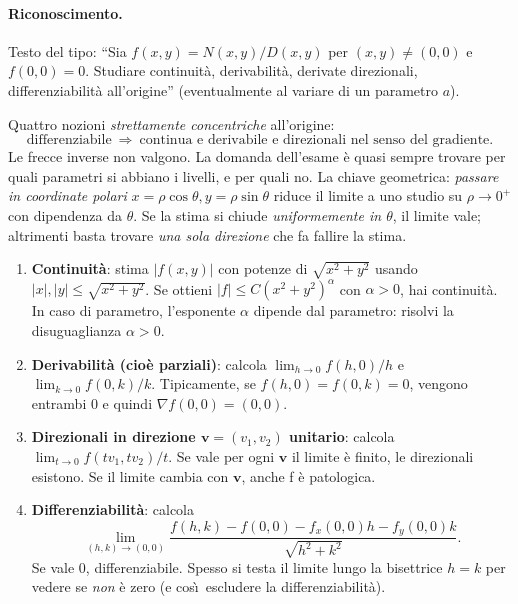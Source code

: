 \documentclass[11pt,a4paper,openany]{book}
\theoremstyle{plain}
\theoremstyle{definition}
\theoremstyle{remark}
\renewcommand{\vec}[1]{\mathbf{#1}}
\begin{document}
\paragraph{Riconoscimento.} Testo del tipo:
``Sia $f(x,y)=N(x,y)/D(x,y)$ per $(x,y)\ne(0,0)$ e $f(0,0)=0$. Studiare
continuit\`a, derivabilit\`a, derivate direzionali, differenziabilit\`a
all'origine'' (eventualmente al variare di un parametro $a$).

\begin{nota}[title={Intuizione}]
Quattro nozioni \emph{strettamente concentriche} all'origine:
\[
\text{differenziabile}\ \Rightarrow\ \text{continua e derivabile e
direzionali nel senso del gradiente}.
\]
Le frecce inverse non valgono. La domanda dell'esame \`e quasi sempre
trovare per quali parametri si abbiano i livelli, e per quali no.
La chiave geometrica: \emph{passare in coordinate polari}
$x=\rho\cos\theta,y=\rho\sin\theta$ riduce il limite a uno studio
su $\rho\to 0^+$ con dipendenza da $\theta$. Se la stima si chiude
\emph{uniformemente in $\theta$}, il limite vale; altrimenti basta
trovare \emph{una sola direzione} che fa fallire la stima.
\end{nota}

\begin{ricetta}[title={Studio in $(0,0)$}]
\begin{enumerate}
\item \textbf{Continuit\`a}: stima $|f(x,y)|$ con potenze di
   $\sqrt{x^2+y^2}$ usando $|x|,|y|\le\sqrt{x^2+y^2}$. Se ottieni
   $|f|\le C(x^2+y^2)^\alpha$ con $\alpha>0$, hai continuit\`a.
   In caso di parametro, l'esponente $\alpha$ dipende dal parametro:
   risolvi la disuguaglianza $\alpha>0$.
\item \textbf{Derivabilit\`a (cio\`e parziali)}: calcola
   $\lim_{h\to 0}f(h,0)/h$ e $\lim_{k\to 0}f(0,k)/k$. Tipicamente,
   se $f(h,0)=f(0,k)=0$, vengono entrambi $0$ e quindi
   $\nabla f(0,0)=(0,0)$.
\item \textbf{Direzionali in direzione $\vec v=(v_1,v_2)$ unitario}:
   calcola $\lim_{t\to 0}f(tv_1,tv_2)/t$. Se vale per ogni $\vec v$
   il limite \`e finito, le direzionali esistono. Se il limite cambia
   con $\vec v$, anche f \`e patologica.
\item \textbf{Differenziabilit\`a}: calcola
   \[
   \lim_{(h,k)\to(0,0)}\frac{f(h,k)-f(0,0)-f_x(0,0)h-f_y(0,0)k}{\sqrt{h^2+k^2}}.
   \]
   Se vale 0, differenziabile. Spesso si testa il limite lungo la
   bisettrice $h=k$ per vedere se \emph{non} \`e zero (e cos\`\i\ escludere
   la differenziabilit\`a).
\end{enumerate}
\end{ricetta}
\end{document}
